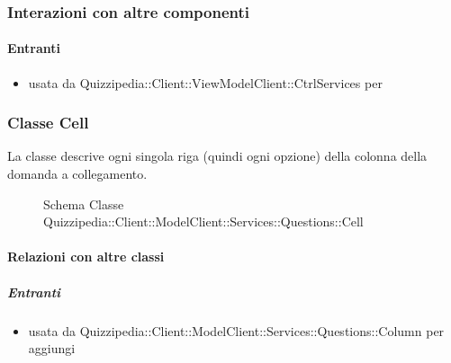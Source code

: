 \subsubsection{Interazioni con altre componenti}
\paragraph{Entranti}
\begin{itemize}
\item usata da Quizzipedia::Client::ViewModelClient::CtrlServices per 
\end{itemize}
\subsubsection{Classe Cell}
La classe descrive ogni singola riga (quindi ogni opzione) della colonna della domanda a collegamento.
\begin{figure}[H]
\centering
\noindent{}
\caption[Schema Classe Cell]{Schema Classe Quizzipedia::Client::ModelClient::Services::Questions::Cell}
\end{figure}
\paragraph{Relazioni con altre classi}
\subparagraph{Entranti}
\begin{itemize}
\item usata da Quizzipedia::Client::ModelClient::Services::Questions::Column per aggiungi
\end{itemize}
